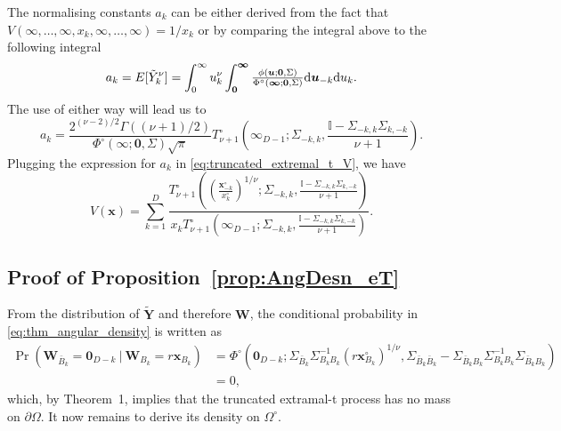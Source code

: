 \documentclass[12pt]{article}
\begin{document}
The normalising constants $a_k$ can be either derived from the fact that $V(\infty,\dots,\infty,x_k,\infty,\dots,\infty) = 1/x_k$ or by comparing the integral above to the following integral 
\begin{equation*}
\label{eq:normalising_trunc}
a_k = E[\tilde Y_k^\nu] = \int_0^\infty u_k^\nu \int_{\bm 0}^{\bm \infty} {\textstyle{\phi(\bm u; \bm 0,\Sigma)\over\Phi^\circ(\bm \infty;\bm 0, \Sigma)}}\text d \bm u_{-k}\text d u_k.	
\end{equation*}
The use of either way will lead us to 
\begin{equation*}
\label{eq:truncate_extremal_t_a}
a_k =\frac{2^{(\nu-2)/2}\Gamma((\nu+1)/2)}{\Phi^\circ(\bm \infty;\bm 0, \Sigma)\sqrt{\pi}} T_{\nu+1}^\circ\left(
\bm \infty_{D-1}
;\Sigma_{-k,k},\frac{\mathbb{I}-\Sigma_{-k,k}\Sigma_{k,-k}}{\nu+1}\right).
\end{equation*}
Plugging the expression for $a_k$ in \eqref{eq:truncated_extremal_t_V}, we have 
\begin{equation*}
V(\bm x) = \sum_{k=1}^D \frac{T_{\nu+1}^\circ\left( \left(\frac{\bm x_{-k}^\circ}{x_k^\circ}\right)^{1/\nu} ;\Sigma_{-k,k},\frac{\mathbb{I}-\Sigma_{-k,k}\Sigma_{k,-k}}{\nu+1}\right)}{x_k T_{\nu+1}^\circ\left(\bm \infty_{D-1};\Sigma_{-k,k},\frac{\mathbb{I}-\Sigma_{-k,k}\Sigma_{k,-k}}{\nu+1}\right)}.	
\end{equation*}

\subsection{Proof of Proposition~\ref{prop:AngDesn_eT}}

From the distribution of $\tilde{\bm Y}$ and therefore $\bm W$, the conditional probability in \eqref{eq:thm_angular_density} is written as
%
\begin{align*}
\Pr(\bm W_{\bar{B}_k} = \bm 0_{D-k} \ | \ \bm W_{B_k} = r \bm x_{B_k} )
& = \Phi^\circ \left( \bm 0_{D-k};
\Sigma_{\bar{B}_k}\Sigma_{B_k B_k}^{-1} \left(r \bm x_{B_k}^\circ\right)^{1/\nu},\Sigma_{\bar{B}_k\bar{B}_k}-\Sigma_{\bar{B}_k B_k}\Sigma_{B_k B_k}^{-1}\Sigma_{\bar{B}_k B_k} \right) \\
& = 0,
\end{align*}
%
which, by Theorem~1, implies that the truncated extramal-t process has no mass on $\partial\Omega$. It now remains to derive its density on $\Omega^\circ$. 
\end{document}
